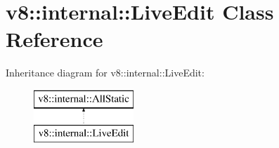 \hypertarget{classv8_1_1internal_1_1_live_edit}{}\section{v8\+:\+:internal\+:\+:Live\+Edit Class Reference}
\label{classv8_1_1internal_1_1_live_edit}
Inheritance diagram for v8\+:\+:internal\+:\+:Live\+Edit\+:\begin{figure}[H]
\begin{center}
\leavevmode
\includegraphics[height=2.000000cm]{classv8_1_1internal_1_1_live_edit}
\end{center}
\end{figure}
